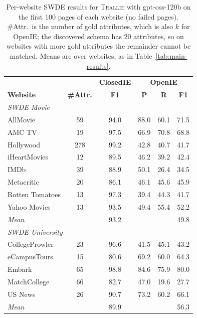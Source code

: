 \begin{table}[t]
  \centering
  \small
  \setlength{\tabcolsep}{3.5pt}
  \begin{tabular}{l c c c c c}
    \hline
     & & \textbf{ClosedIE} & \multicolumn{3}{c}{\textbf{OpenIE}} \\
    \textbf{Website} & \textbf{\#Attr.} & \textbf{F1} & \textbf{P} & \textbf{R} & \textbf{F1} \\
    \hline
    \multicolumn{6}{l}{\textit{SWDE Movie}} \\
    AllMovie        & 59  & 94.0 & 88.0 & 60.1 & 71.5 \\
    AMC TV          & 19  & 97.5 & 66.9 & 70.8 & 68.8 \\
    Hollywood       & 278 & 99.2 & 42.8 & 40.7 & 41.7 \\
    iHeartMovies    & 12  & 89.5 & 46.2 & 39.2 & 42.4 \\
    IMDb            & 39  & 88.9 & 50.1 & 26.4 & 34.5 \\
    Metacritic      & 20  & 86.1 & 46.1 & 45.6 & 45.9 \\
    Rotten Tomatoes & 13  & 97.3 & 39.4 & 44.3 & 41.7 \\
    Yahoo Movies    & 13  & 93.5 & 49.4 & 55.4 & 52.2 \\
    \textit{Mean}   &     & 93.2 &      &      & 49.8 \\
    \hline
    \multicolumn{6}{l}{\textit{SWDE University}} \\
    CollegeProwler  & 23  & 96.6 & 41.5 & 45.1 & 43.2 \\
    eCampusTours    & 15  & 80.6 & 69.2 & 60.0 & 64.3 \\
    Embark          & 65  & 98.8 & 84.6 & 75.9 & 80.0 \\
    MatchCollege    & 66  & 82.7 & 47.0 & 19.6 & 27.7 \\
    US News         & 26  & 90.7 & 73.2 & 60.2 & 66.1 \\
    \textit{Mean}   &     & 89.9 &      &      & 56.3 \\
    \hline
  \end{tabular}
  \caption{Per-website SWDE results for \textsc{Trallie} with gpt-oss-120b on the first 100 pages of each website (no failed pages).
    \#Attr.\ is the number of gold attributes, which is also $k$ for OpenIE; the discovered schema has 20 attributes, so on websites with more gold attributes the remainder cannot be matched.
    Means are over websites, as in Table~\ref{tab:main-results}.}
  \label{tab:swde-per-site}
\end{table}
